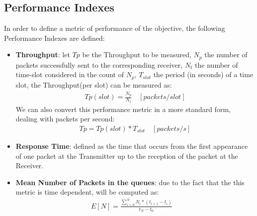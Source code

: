 \subsection{Performance Indexes}
In order to define a metric of performance of the objective, the following Performance Indexes are defined:
\begin{itemize}
	\item \textbf{Throughput}: let $Tp$ be the Throughput to be measured, $N_{p}$ the number of packets successfully sent to the corresponding receiver, $N_{t}$ the number of time-slot considered in the count of $N_{p}$, $T_{slot}$ the period (in seconds) of a time slot, the Throughput(per slot) can be measured as:
	\begin{align*}
	Tp(slot) = \frac{N_{p}}{N_{t}} \quad [packets/slot]
	\end{align*}
	We can also convert this performance metric in a more standard form, dealing with packets per second:
	\begin{align*}
	Tp = Tp(slot) * T_{slot} \quad [packets/s]
	\end{align*}
	
	
	\item \textbf{Response Time}: defined as the time that occurs from the first appearance of one packet at the Transmitter up to the reception of the packet at the Receiver.
	
	\item \textbf{Mean Number of Packets in the queues}: due to the fact that the this metric is time dependent, will be computed as:
	\begin{align*}
	E[N] = \frac{\sum_{i = 0}^{N}N_{i}*(t_{i+1} - t_{i})}{t_{N} - t_{0}} \quad 
	\end{align*}
	  
\end{itemize}